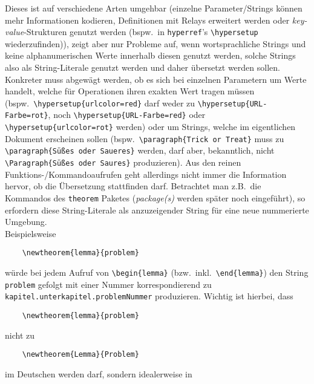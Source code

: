 Dieses ist auf verschiedene Arten umgehbar (einzelne Parameter/Strings können mehr Informationen kodieren, Definitionen mit Relays erweitert werden oder \textit{key-value}-Strukturen genutzt werden (bspw.\ in \texttt{hyperref}'s \verb|\hypersetup| wiederzufinden)), zeigt aber nur Probleme auf, wenn wortsprachliche Strings und keine alphanumerischen Werte innerhalb diesen genutzt werden, solche Strings also als String-Literale genutzt werden und daher übersetzt werden sollen. %
Konkreter muss abgewägt werden, ob es sich bei einzelnen Parametern um Werte handelt, welche für Operationen ihren exakten Wert tragen müssen (bspw.\ \verb"\hypersetup{urlcolor=red}" darf weder zu \verb"\hypersetup{URL-Farbe=rot}", noch \verb"\hypersetup{URL-Farbe=red}" oder \verb"\hypersetup{urlcolor=rot}" werden) oder um Strings, welche im eigentlichen Dokument erscheinen sollen (bspw.\ \verb"\paragraph{Trick or Treat}" muss zu \verb"\paragraph{Süßes oder Saueres}" werden, darf aber, bekanntlich, nicht \verb"\Paragraph{Süßes oder Saures}" produzieren). 
Aus den reinen Funktions-/Kommandoaufrufen geht allerdings nicht immer die Information hervor, ob die Übersetzung stattfinden darf. Betrachtet man z.B.\ die Kommandos des \texttt{theorem} Paketes (\textit{package(s)} werden später noch eingeführt), so erfordern diese String-Literale als anzuzeigender String für eine neue nummerierte Umgebung.\\
Beispielsweise
\begin{Verbatim}
    \newtheorem{lemma}{problem}
\end{Verbatim}
würde bei jedem Aufruf von \verb"\begin{lemma}" (bzw.\ inkl.\ \verb|\end{lemma}|) den String \verb"problem" gefolgt mit einer Nummer korrespondierend zu \texttt{kapitel.unterkapitel.problemNummer} produzieren. Wichtig ist hierbei, dass 
\begin{Verbatim}
    \newtheorem{lemma}{problem}
\end{Verbatim}
nicht zu 
\begin{Verbatim}
    \newtheorem{Lemma}{Problem}
\end{Verbatim}
im Deutschen werden darf, sondern idealerweise in 
